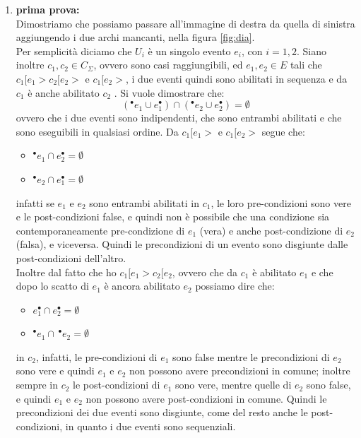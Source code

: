 \begin{enumerate}
  \item \textbf{prima prova:}\\
  Dimostriamo che possiamo passare all'immagine di destra da quella di sinistra
  aggiungendo i due archi mancanti, nella figura \ref{fig:dia}.\\
  Per semplicità diciamo che $U_i$ è un singolo evento $e_i$, con $i=1, 2$. Siano
  inoltre $c_1, c_2\in C_\Sigma$, ovvero sono casi raggiungibili, ed $e_1, e_2\in
  E$ tali che $c_1 [e_1 > c_2 [e_2 > \mbox{ e } c_1 [e_2 >$, i due eventi quindi
  sono abilitati in sequenza e da $c_1$ è anche abilitato $c_2$ . Si vuole
  dimostrare che: 
  \[(^\bullet e_1\cup e_1^\bullet)\cap(^\bullet e_2\cup e_2^\bullet)=\emptyset\]
  ovvero che i due eventi sono indipendenti, che sono entrambi abilitati e che
  sono eseguibili in qualsiasi ordine.
  \newpage
  Da $c_1 [e_1 > \mbox{ e }c_1 [e_2 >$ segue che:
  \begin{itemize}
    \item $^\bullet e_1\cap e_2^\bullet=\emptyset$
    \item $^\bullet e_2\cap e_1^\bullet=\emptyset$
  \end{itemize}
  infatti se $e_1$ e $e_2$ sono entrambi abilitati in $c_1$, le loro
  pre-condizioni sono vere e le post-condizioni false, e quindi non è possibile
  che una condizione sia contemporaneamente pre-condizione di $e_1$ (vera) e
  anche post-condizione di $e_2$ (falsa), e viceversa. Quindi le precondizioni
  di un evento sono disgiunte dalle post-condizioni dell'altro.\\
  Inoltre dal fatto che ho $c_1 [e_1 > c_2 [e_2$, ovvero che da $c_1$ è
  abilitato $e_1$ e che dopo lo scatto di $e_1$ è ancora abilitato $e_2$
  possiamo dire che:
  \begin{itemize}
    \item $e_1^\bullet\cap e_2^\bullet=\emptyset$
    \item $^\bullet e_1\cap\, ^\bullet e_2=\emptyset$
  \end{itemize}
  in $c_2$, infatti, le pre-condizioni di $e_1$ sono false mentre le
  precondizioni di $e_2$ sono vere e quindi $e_1$ e $e_2$ non possono avere
  precondizioni in comune; inoltre sempre in $c_2$ le post-condizioni di $e_1$
  sono vere, mentre quelle di $e_2$ sono false, e quindi $e_1$ e $e_2$ non
  possono avere post-condizioni in comune. Quindi le precondizioni dei due
  eventi sono disgiunte, come del resto anche le post-condizioni, in quanto i due
  eventi sono sequenziali.\\

\end{enumerate}
